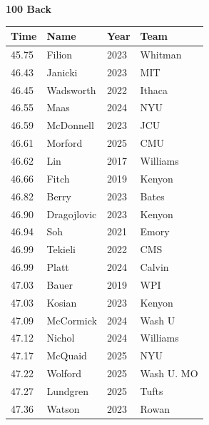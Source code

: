 \noindent\begin{minipage}[t]{0.98\textwidth}
\centering
\textbf{\textcolor{teamprimary}{100 Back}}\par
\vspace{0.5em}
\centering
\small
\renewcommand{\arraystretch}{1.0}
\setlength{\tabcolsep}{4pt}
\begin{tabular}{@{}p{2.5cm}p{4.5cm}p{1.5cm}p{2.5cm}@{}}
\toprule
\textbf{Time} & \textbf{Name} & \textbf{Year} & \textbf{Team} \\
\midrule
45.75 & Filion & 2023 & Whitman \\
46.43 & Janicki & 2023 & MIT \\
46.45 & Wadsworth & 2022 & Ithaca \\
46.55 & Maas & 2024 & NYU \\
46.59 & McDonnell & 2023 & JCU \\
46.61 & Morford & 2025 & CMU \\
46.62 & Lin & 2017 & Williams \\
46.66 & Fitch & 2019 & Kenyon \\
46.82 & Berry & 2023 & Bates \\
46.90 & Dragojlovic & 2023 & Kenyon \\
46.94 & Soh & 2021 & Emory \\
46.99 & Tekieli & 2022 & CMS \\
46.99 & Platt & 2024 & Calvin \\
47.03 & Bauer & 2019 & WPI \\
47.03 & Kosian & 2023 & Kenyon \\
47.09 & McCormick & 2024 & Wash U \\
47.12 & Nichol & 2024 & Williams \\
47.17 & McQuaid & 2025 & NYU \\
47.22 & Wolford & 2025 & Wash U. MO \\
47.27 & Lundgren & 2025 & Tufts \\
47.36 & Watson & 2023 & Rowan \\
\bottomrule
\end{tabular}
\end{minipage}
\vspace{1.2em}
